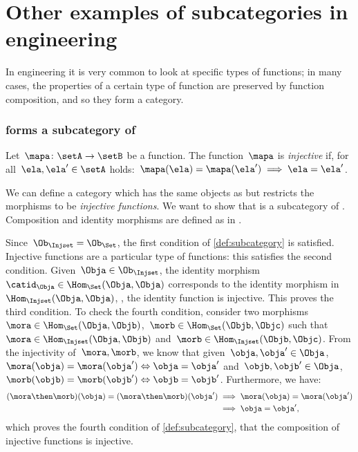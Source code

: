 \section{Other examples of subcategories in engineering}

In engineering it is very common to look at specific types of functions; in many cases, the properties of a certain type of function are preserved by function composition, and so they form a category.

\subsubsection{\Injset forms a subcategory of \Set}
\begin{definition}
  \label{def:injective-function}
  Let~$\mapa \colon \setA\to \setB$ be a function. The function~$\mapa$ is \emph{injective} if, for all~$\ela,\ela'\in \setA$ holds:~$\mapa(\ela)=\mapa(\ela')\implies \ela=\ela'$.
\end{definition}


\begin{example}
  We can define a category \iindex{\Injset} which has the same objects as \Set but restricts the morphisms to be \emph{injective functions}.
  We want to show that \Injset is a subcategory of \Set. Composition and identity morphisms are defined as in \Set.

  Since~$\Ob_{\Injset}=\Ob_{\Set}$, the first condition of \cref{def:subcategory} is satisfied. Injective functions are a particular type of functions: this satisfies the second condition. Given~$\Obja\in \Ob_{\Injset}$, the identity morphism~$\catid_\Obja\in \Hom_{\Set}(\Obja,\Obja)$ corresponds to the identity morphism in~$\Hom_{\Injset}(\Obja,\Obja)$, \ie , the identity function is injective. This proves the third condition. To check the fourth condition, consider two morphisms~$\mora \in \Hom_\Set(\Obja,\Objb)$,~$\morb \in \Hom_\Set(\Objb,\Objc)$ such that~$\mora \in \Hom_\Injset(\Obja,\Objb)$ and~$\morb\in \Hom_\Injset(\Objb,\Objc)$. From the injectivity of~$\mora,\morb$, we know that given~$\obja,\obja'\in \Obja$, $\mora(\obja)=\mora(\obja') \Leftrightarrow \obja=\obja'$ and~$\objb,\objb'\in \Obja$,~$\morb(\objb)=\morb(\objb') \Leftrightarrow \objb=\objb'$. Furthermore, we have:
  \begin{equation*}
    \begin{aligned}
    (\mora\then \morb)(\obja)
      =(\mora \then \morb)(\obja')&\implies \mora(\obja)=\mora(\obja')\\
      &\implies \obja=\obja',
    \end{aligned}
  \end{equation*}
  which proves the fourth condition of \cref{def:subcategory}, \ie  that the composition of injective functions is injective.
\end{example}



